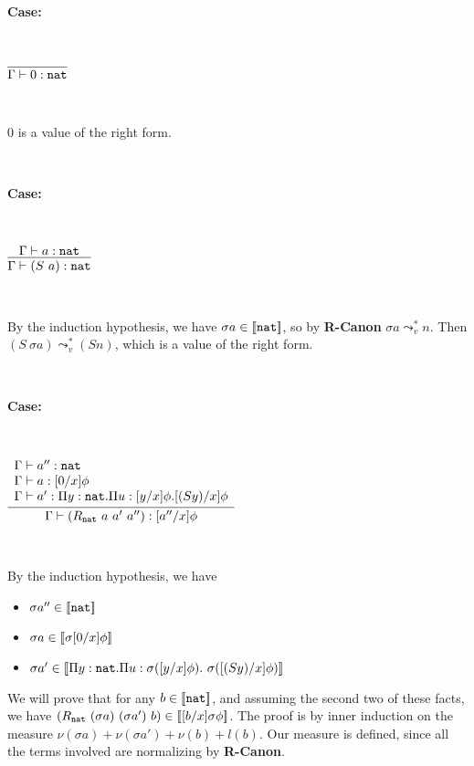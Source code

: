 \documentclass[copyright]{eptcs}
\newcommand{\nat}[0]{\texttt{nat}}
\newcommand{\leadstov}[0]{\leadsto_v}
\newcommand{\interp}[1]{[\negthinspace[#1]\negthinspace]}
\begin{document}
\ 

\noindent \textbf{Case:}

\

$\infer{\Gamma\vdash 0:\nat}{\ }$

\

\noindent$0$ is a value of the right form.

\ 

\noindent \textbf{Case:}

\

$\infer{\Gamma\vdash (S\ a):\nat}{\Gamma\vdash a:\nat  }$

\ 

\noindent By the induction hypothesis, we have $\sigma
a\in\interp{\nat}$, so by \textbf{R-Canon}  $\sigma a\leadstov^*
n$. Then $(S\ \sigma a)\leadstov^* (S n)$, which is a value of the
right form.

\ 

\noindent \textbf{Case:}

\

$\infer{\Gamma\vdash (R_\nat\ a\ a'\ a''):[a''/x]\phi}
      {\begin{array}{l}\Gamma \vdash a'' : \nat \\
       \Gamma \vdash a : [0/x]\phi \\
       \Gamma \vdash a' : \Pi y:\nat. \Pi u : [y/x]\phi. [(S y)/x]\phi
       \end{array}}$

\ 

\noindent By the induction hypothesis, we have
\begin{itemize}
\item $\sigma a''\in\interp{\nat}$
\item $\sigma a\in\interp{\sigma[0/x]\phi}$
\item $\sigma a'\in\interp{\Pi y:\nat.\Pi u:\sigma([y/x]\phi).\ \sigma([(S y)/x]\phi)}$
\end{itemize}

\noindent We will prove that for any $b\in\interp{\nat}$, and
assuming the second two of these facts, we have $(R_\nat\ (\sigma
a)\ (\sigma a')\ b) \in\interp{[b/x]\sigma\phi}$. The proof is
by inner induction on the measure $\nu(\sigma a)+\nu(\sigma
a')+\nu(b)+l(b)$.  Our measure is defined, since all the terms
involved are normalizing by \textbf{R-Canon}.
\end{document}
